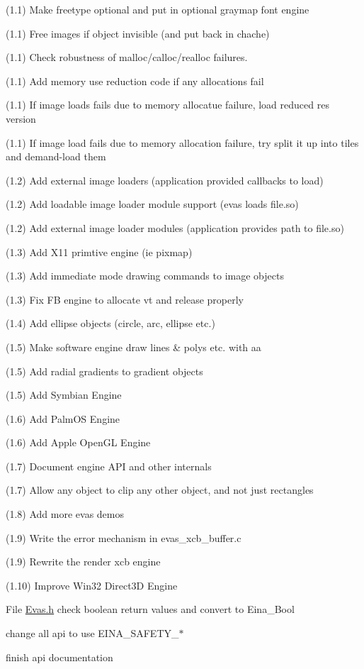 \begin{DoxyDescription}
(1.1) Make freetype optional and put in optional graymap font engine 

(1.1) Free images if object invisible (and put back in chache) 

(1.1) Check robustness of malloc/calloc/realloc failures. 

(1.1) Add memory use reduction code if any allocations fail 

(1.1) If image loads fails due to memory allocatue failure, load reduced res version 

(1.1) If image load fails due to memory allocation failure, try split it up into tiles and demand-\/load them 

(1.2) Add external image loaders (application provided callbacks to load) 

(1.2) Add loadable image loader module support (evas loads file.so) 

(1.2) Add external image loader modules (application provides path to file.so) 

(1.3) Add X11 primtive engine (ie pixmap) 

(1.3) Add immediate mode drawing commands to image objects 

(1.3) Fix FB engine to allocate vt and release properly 

(1.4) Add ellipse objects (circle, arc, ellipse etc.) 

(1.5) Make software engine draw lines \& polys etc. with aa 

(1.5) Add radial gradients to gradient objects 

(1.5) Add Symbian Engine 

(1.6) Add PalmOS Engine 

(1.6) Add Apple OpenGL Engine 

(1.7) Document engine API and other internals 

(1.7) Allow any object to clip any other object, and not just rectangles 

(1.8) Add more evas demos 

(1.9) Write the error mechanism in evas\_\-xcb\_\-buffer.c 

(1.9) Rewrite the render xcb engine 

(1.10) Improve Win32 Direct3D Engine
\end{DoxyDescription}

\label{todo__todo000005}
\hypertarget{todo__todo000005}{}
 
\begin{DoxyDescription}
\item[File \hyperlink{Evas_8h}{Evas.h} ]check boolean return values and convert to Eina\_\-Bool 

change all api to use EINA\_\-SAFETY\_\-$\ast$ 

finish api documentation 
\end{DoxyDescription}

